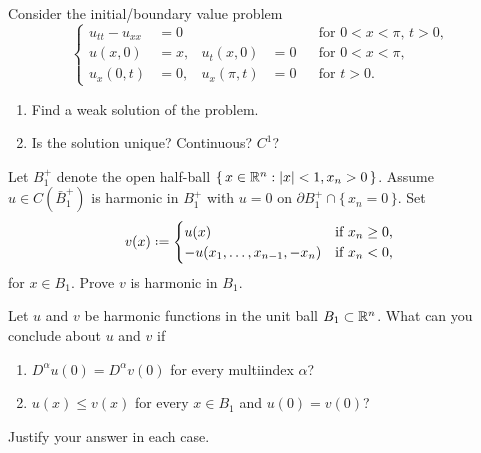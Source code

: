 \begin{problem}
  Consider the initial/boundary value problem
    \[
     \left\{
       \begin{aligned}
         u_{tt}-u_{xx}&=0&&&&\text{for \(0<x<\pi\), \(t>0\),}\\
         u(x,0)&=x,&u_t(x,0)&=0&&\text{for \(0<x<\pi\),}\\
         u_x(0,t)&=0,&u_x(\pi,t)&=0&&\text{for \(t>0\).}
      \end{aligned}
    \right.
  \]
  \begin{enumerate}[label=(\alph*),noitemsep]
  \item Find a weak solution of the problem.
  \item Is the solution unique? Continuous? \(C^1\)?
  \end{enumerate}
\end{problem}
\begin{solution*}
\end{solution*}

\begin{problem}
  Let \(B_1^+\) denote the open half-ball
  \(\{\,x\in\mathbb{R}^n:|x|<1,x_n>0\,\}\). Assume \(u\in C(\bar B_1^+)\) is
  harmonic in \(B_1^+\) with \(u=0\) on \(\partial
  B_1^+\cap\{\,x_n=0\,\}\). Set
  \[
    v(x)\defeq
    \begin{cases}
      u(x)&\text{if \(x_n\geq 0\),}\\
      -u(x_1,\dotsc,x_{n-1},-x_n)&\text{if \(x_n<0\),}
    \end{cases}
  \]
  for \(x\in B_1\). Prove \(v\) is harmonic in \(B_1\).
\end{problem}
\begin{solution*}
\end{solution*}

\begin{problem}
  Let \(u\) and \(v\) be harmonic functions in the unit ball
  \(B_1\subset\mathbb{R}^n\). What can you conclude about \(u\) and \(v\) if
  \begin{enumerate}[label=(\alph*),noitemsep]
  \item \(D^\alpha u(0)=D^\alpha v(0)\) for every multiindex \(\alpha\)?
  \item \(u(x)\leq v(x)\) for every \(x\in B_1\) and \(u(0)=v(0)\)?
  \end{enumerate}
  Justify your answer in each case.
\end{problem}
\begin{solution*}
\end{solution*}

